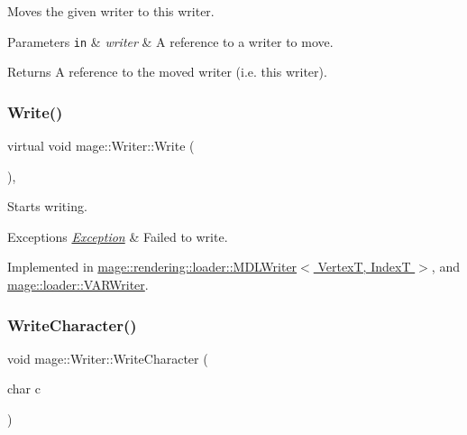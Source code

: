 Moves the given writer to this writer.


\begin{DoxyParams}[1]{Parameters}
\mbox{\tt in}  & {\em writer} & A reference to a writer to move. \\
\hline
\end{DoxyParams}
\begin{DoxyReturn}{Returns}
A reference to the moved writer (i.\+e. this writer). 
\end{DoxyReturn}
\hypertarget{classmage_1_1_writer_a9baf695ef7f6180bef883f60bcb3ac07}{}\label{classmage_1_1_writer_a9baf695ef7f6180bef883f60bcb3ac07} 
\subsubsection{\texorpdfstring{Write()}{Write()}}
{\footnotesize\ttfamily virtual void mage\+::\+Writer\+::\+Write (\begin{DoxyParamCaption}{ }\end{DoxyParamCaption})\hspace{0.3cm}{\ttfamily [private]}, {}}

Starts writing.


\begin{DoxyExceptions}{Exceptions}
{\em \hyperlink{classmage_1_1_exception}{Exception}} & Failed to write. \\
\hline
\end{DoxyExceptions}


Implemented in \hyperlink{classmage_1_1rendering_1_1loader_1_1_m_d_l_writer_a1506b1a09c7a7c1ee1e206cc6d5cd0e0}{mage\+::rendering\+::loader\+::\+M\+D\+L\+Writer$<$ Vertex\+T, Index\+T $>$}, and \hyperlink{classmage_1_1loader_1_1_v_a_r_writer_af2bbf94353f1b4b01aa56e8dd9c89d7f}{mage\+::loader\+::\+V\+A\+R\+Writer}.

\hypertarget{classmage_1_1_writer_aa1ef04f5e69c44afda56704c2823316c}{}\label{classmage_1_1_writer_aa1ef04f5e69c44afda56704c2823316c} 
\subsubsection{\texorpdfstring{Write\+Character()}{WriteCharacter()}}
{\footnotesize\ttfamily void mage\+::\+Writer\+::\+Write\+Character (\begin{DoxyParamCaption}\item[{char}]{c }\end{DoxyParamCaption})\hspace{0.3cm}{\ttfamily [protected]}}

